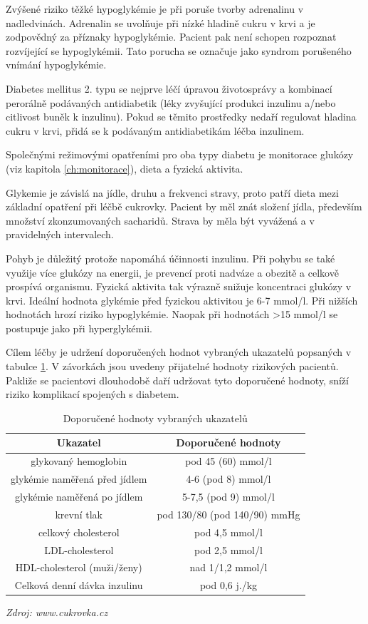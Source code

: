 Zvýšené riziko těžké hypoglykémie je při poruše tvorby adrenalinu v nadledvinách. Adrenalin se uvolňuje při nízké hladině cukru v krvi a je zodpovědný za příznaky hypoglykémie. Pacient pak není schopen rozpoznat rozvíjející se hypoglykémii. Tato porucha se označuje jako syndrom porušeného vnímání hypoglykémie.

Diabetes mellitus 2. typu se nejprve léčí úpravou životosprávy a kombinací perorálně podávaných antidiabetik (léky zvyšující produkci inzulinu a/nebo citlivost buněk k inzulinu). Pokud se těmito prostředky nedaří regulovat hladina cukru v krvi, přidá se k podávaným antidiabetikám léčba inzulinem.

Společnými režimovými opatřeními pro oba typy diabetu je monitorace glukózy (viz kapitola \ref{ch:monitorace}), dieta a fyzická aktivita.

Glykemie je závislá na jídle, druhu a frekvenci stravy, proto patří dieta mezi základní opatření při léčbě cukrovky. Pacient by měl znát složení jídla, především množství zkonzumovaných sacharidů. Strava by měla být vyvážená a v pravidelných intervalech.

Pohyb je důležitý protože napomáhá účinnosti inzulinu. Při pohybu se také využije více glukózy na energii, je prevencí proti nadváze a obezitě a celkově prospívá organismu. Fyzická aktivita tak výrazně snižuje koncentraci glukózy v krvi. Ideální hodnota glykémie před fyzickou aktivitou je 6-7 mmol/l. Při nižších hodnotách hrozí riziko hypoglykémie. Naopak při hodnotách >15 mmol/l se postupuje jako při hyperglykémii.

Cílem léčby je udržení doporučených hodnot vybraných ukazatelů popsaných v tabulce \ref{tab:ukazatele}. V závorkách jsou uvedeny přijatelné hodnoty rizikových pacientů. Pakliže se pacientovi dlouhodobě daří udržovat tyto doporučené hodnoty, sníží riziko komplikací spojených s diabetem.
\cite{Diabetes.Psottova} %

\begin{table}[H]
\caption{Doporučené hodnoty vybraných ukazatelů}
\label{tab:ukazatele}
\centering
\begin{tabular}{|c|c|}
\hline 
\textbf{Ukazatel} & \textbf{Doporu\v{c}ené hodnoty}\tabularnewline
\hline 
\hline 
glykovaný hemoglobin & pod 45 (60) mmol/l\\ \hline 
glykémie naměřená před jídlem & 4-6 (pod 8) mmol/l\\ \hline 
glykémie naměřená po jídlem & 5-7,5 (pod 9) mmol/l\\ \hline 
krevní tlak & pod 130/80 (pod 140/90) mmHg\\ \hline 
celkový cholesterol & pod 4,5 mmol/l\\ \hline 
LDL-cholesterol & pod 2,5 mmol/l\\ \hline 
HDL-cholesterol (muži/ženy) & nad 1/1,2 mmol/l\\ \hline 
Celková denní dávka inzulinu & pod 0,6 j./kg\\
\hline 
\end{tabular}
\textit{Zdroj: www.cukrovka.cz \citep{cukrovka.cz}}
\end{table}


